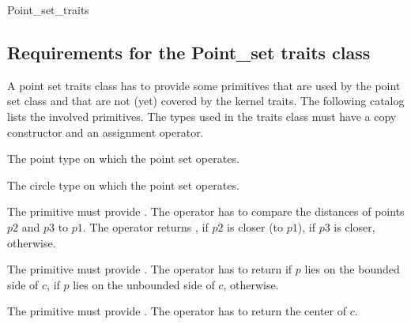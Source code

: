 \begin{ccRefConcept} {Point_set_traits}

\subsection{Requirements for the Point\_set traits class}

A point set traits class has to provide some primitives that are used by the point set class
and that are not (yet) covered by the kernel traits.
The following catalog lists the involved primitives.
The types used in the traits class must have a copy constructor and an assignment operator.

\ccTypes

%
       {The point type on which the point set operates.}

%
       {The circle type on which the point set operates.}

%
       {The primitive must provide 
	.
	The operator has to compare the distances of points $p2$ and $p3$ to $p1$.
        The operator returns , if $p2$ is closer (to $p1$),  if $p3$ is closer,
         otherwise.
       }      
	
	{The primitive must provide 
	.
	The operator has to return  if $p$ lies on the bounded side of $c$,
	 if $p$ lies on the unbounded side of $c$,  otherwise.}
	
	{The primitive must provide 
	.
	The operator has to return the center of $c$.}	

\end{ccRefConcept}
